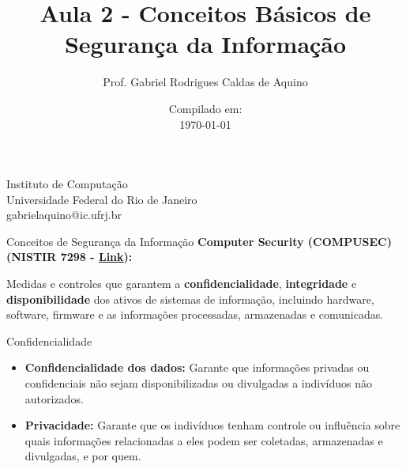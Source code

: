 \title{Aula 2 - Conceitos Básicos de Segurança da Informação}

\author{Prof. Gabriel Rodrigues Caldas de Aquino}

\institute
{
  Instituto de Computação \\
  Universidade Federal do Rio de Janeiro \\
  gabrielaquino@ic.ufrj.br%
}
\date{Compilado em: \\ \today} %



\begin{frame}
  \titlepage
\end{frame}



\begin{frame}{Conceitos de Segurança da Informação}
  \textbf{Computer Security (COMPUSEC) (NISTIR 7298 - \href{https://csrc.nist.gov/pubs/ir/7298/r3/final}{Link}):}
  \begin{block}{}
    Medidas e controles que garantem a \textbf{confidencialidade}, \textbf{integridade} e \textbf{disponibilidade} dos ativos de sistemas de informação, incluindo hardware, software, firmware e as informações processadas, armazenadas e comunicadas.
  \end{block}

  \vspace{0.5cm}


\end{frame}
\begin{frame}{Confidencialidade}



  \begin{itemize}
    \item \textbf{Confidencialidade dos dados:} Garante que informações privadas ou confidenciais não sejam disponibilizadas ou divulgadas a indivíduos não autorizados.
    \item \textbf{Privacidade:} Garante que os indivíduos tenham controle ou influência sobre quais informações relacionadas a eles podem ser coletadas, armazenadas e divulgadas, e por quem.
  \end{itemize}

\end{frame}

